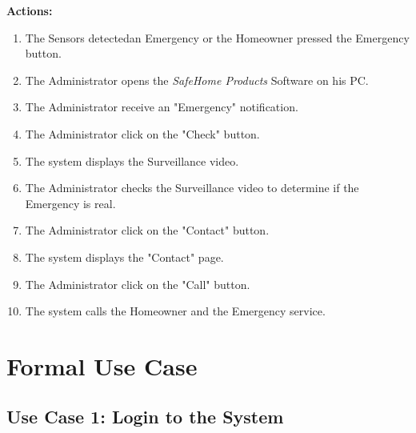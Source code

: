 \documentclass[twoside,11pt]{article}
\begin{document}
\textbf{Actions:}
\begin{enumerate}
    \item The Sensors detectedan Emergency or the Homeowner pressed the Emergency button.
    \item The Administrator opens the \emph{SafeHome Products} Software on his PC.
    \item The Administrator receive an "Emergency" notification.
    \item The Administrator click on the "Check" button.
    \item The system displays the Surveillance video.
    \item The Administrator checks the Surveillance video to determine if the Emergency is real.
    \item The Administrator click on the "Contact" button.
    \item The system displays the "Contact" page.
    \item The Administrator click on the "Call" button.
    \item The system calls the Homeowner and the Emergency service.
\end{enumerate}
\newpage

\section{Formal Use Case}
\fontsize{10}{12}\selectfont


\subsection{Use Case 1: Login to the System}
\end{document}
